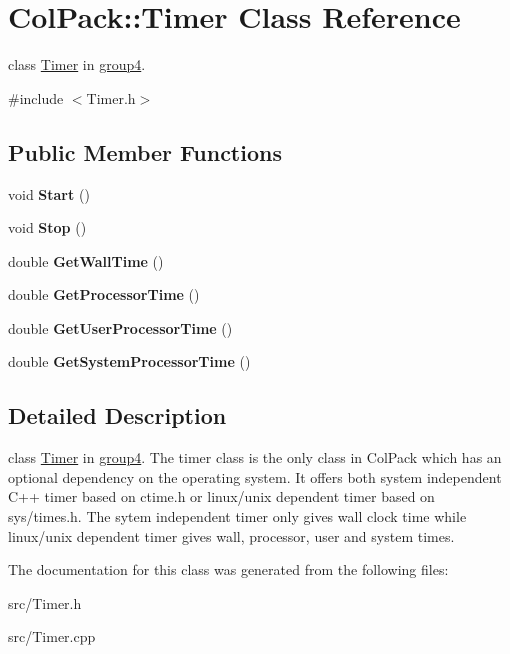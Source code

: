 \hypertarget{classColPack_1_1Timer}{
\section{ColPack::Timer Class Reference}
\label{classColPack_1_1Timer}
}


class \hyperlink{classColPack_1_1Timer}{Timer} in \hyperlink{}{group4}.  


{\ttfamily \#include $<$Timer.h$>$}\subsection*{Public Member Functions}
\begin{DoxyCompactItemize}
\item 
\hypertarget{classColPack_1_1Timer_a2ee878c906acc649e315741783729748}{
void {\bfseries Start} ()}
\label{classColPack_1_1Timer_a2ee878c906acc649e315741783729748}

\item 
\hypertarget{classColPack_1_1Timer_aee44f24596bbc8bfeea07eb85b699f79}{
void {\bfseries Stop} ()}
\label{classColPack_1_1Timer_aee44f24596bbc8bfeea07eb85b699f79}

\item 
\hypertarget{classColPack_1_1Timer_afa9cdbc07f53e5b09b5b1101930b05ec}{
double {\bfseries GetWallTime} ()}
\label{classColPack_1_1Timer_afa9cdbc07f53e5b09b5b1101930b05ec}

\item 
\hypertarget{classColPack_1_1Timer_a3ca3b7a0736317bec308c1d9db702dd0}{
double {\bfseries GetProcessorTime} ()}
\label{classColPack_1_1Timer_a3ca3b7a0736317bec308c1d9db702dd0}

\item 
\hypertarget{classColPack_1_1Timer_aeb1ba675cefe25bbea493ce25af1e67c}{
double {\bfseries GetUserProcessorTime} ()}
\label{classColPack_1_1Timer_aeb1ba675cefe25bbea493ce25af1e67c}

\item 
\hypertarget{classColPack_1_1Timer_a396a4839280ad5e4f06da4b7d1ee07f5}{
double {\bfseries GetSystemProcessorTime} ()}
\label{classColPack_1_1Timer_a396a4839280ad5e4f06da4b7d1ee07f5}

\end{DoxyCompactItemize}


\subsection{Detailed Description}
class \hyperlink{classColPack_1_1Timer}{Timer} in \hyperlink{}{group4}. The timer class is the only class in ColPack which has an optional dependency on the operating system. It offers both system independent C++ timer based on ctime.h or linux/unix dependent timer based on sys/times.h. The sytem independent timer only gives wall clock time while linux/unix dependent timer gives wall, processor, user and system times. 

The documentation for this class was generated from the following files:\begin{DoxyCompactItemize}
\item 
src/Timer.h\item 
src/Timer.cpp\end{DoxyCompactItemize}
